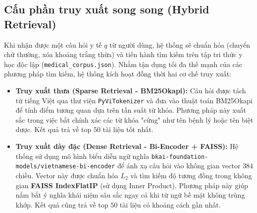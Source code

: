 \subsection{Cấu phần truy xuất song song (Hybrid Retrieval)}
Khi nhận được một câu hỏi y tế $q$ từ người dùng, hệ thống sẽ chuẩn hóa (chuyển chữ thường, xóa khoảng trắng thừa) và tiến hành tìm kiếm trên tập tri thức y học độc lập (\texttt{medical\_corpus.json}). Nhằm tận dụng tối đa thế mạnh của các phương pháp tìm kiếm, hệ thống kích hoạt đồng thời hai cơ chế truy xuất:
\begin{itemize}
    \item \textbf{Truy xuất thưa (Sparse Retrieval - BM25Okapi):} Câu hỏi được tách từ tiếng Việt qua thư viện \texttt{PyViTokenizer} và đưa vào thuật toán BM25Okapi để tính điểm tương quan dựa trên tần suất từ khóa. Phương pháp này xuất sắc trong việc bắt chính xác các từ khóa "cứng" như tên bệnh lý hoặc tên biệt dược. Kết quả trả về top $50$ tài liệu tốt nhất.
    \item \textbf{Truy xuất dày đặc (Dense Retrieval - Bi-Encoder + FAISS):} Hệ thống sử dụng mô hình biểu diễn ngữ nghĩa \texttt{bkai-foundation-models/vietnamese-bi-encoder} để ánh xạ câu hỏi vào không gian vector $384$ chiều. Vector này được chuẩn hóa $L_2$ và tìm kiếm độ tương đồng trong không gian \textbf{FAISS IndexFlatIP} (sử dụng Inner Product). Phương pháp này giúp nắm bắt ý nghĩa khái niệm sâu sắc ngay cả khi từ ngữ bề mặt không trùng khớp. Kết quả cũng trả về top $50$ tài liệu có khoảng cách gần nhất.
\end{itemize}

